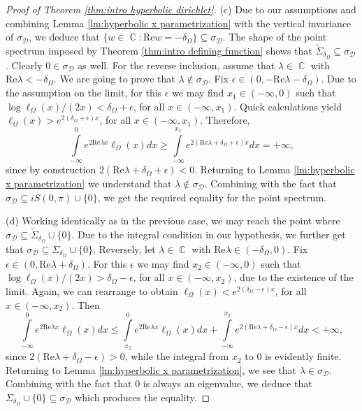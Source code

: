 \documentclass[10pt,a4paper]{amsart}
\DeclareMathOperator{\C}{\mathbb{C}}
\begin{document}
\begin{proof}[Proof of Theorem \ref{thm:intro hyperbolic dirichlet}]
		(c) Due to our assumptions and combining Lemma \ref{lm:hyperbolic x parametrization} with the vertical invariance of $\sigma_\mathcal{D}$, we deduce that $\{w\in\C:\mathrm{Re}w=-\delta_\Omega\}\subseteq\sigma_{\mathcal{D}}$. The shape of the point spectrum imposed by Theorem \ref{thm:intro defining function} shows that $\widetilde{\Sigma}_{\delta_\Omega}\subseteq\sigma_{\mathcal{D}}$. Clearly $0\in\sigma_{\mathcal{D}}$ as well. For the reverse inclusion, assume that $\lambda\in\C$ with $\mathrm{Re}\lambda<-\delta_\Omega$. We are going to prove that $\lambda\notin\sigma_{\mathcal{D}}$. Fix $\epsilon\in(0,-\mathrm{Re}\lambda-\delta_\Omega)$. Due to the assumption on the limit, for this $\epsilon$ we may find $x_1\in(-\infty,0)$ such that $\log\ell_\Omega(x)/(2x)<\delta_\Omega+\epsilon$, for all $x\in(-\infty,x_1)$. Quick calculations yield $\ell_\Omega(x)>e^{2(\delta_\Omega+\epsilon)x}$, for all $x\in(-\infty,x_1)$. Therefore,
		\begin{equation*}
			\int\limits_{-\infty}^{0}e^{2\mathrm{Re}\lambda x}\ell_\Omega(x)dx\ge\int\limits_{-\infty}^{x_1}e^{2(\mathrm{Re}\lambda+\delta_\Omega+\epsilon)x}dx=+\infty,
		\end{equation*}
		since by construction $2(\mathrm{Re}\lambda+\delta_\Omega+\epsilon)<0$. Returning to Lemma \ref{lm:hyperbolic x parametrization} we understand that $\lambda\notin\sigma_{\mathcal{D}}$. Combining with the fact that $\sigma_{\mathcal{D}}\subseteq iS(0,\pi)\cup\{0\}$, we get the required equality for the point spectrum.
		
		(d) Working identically as in the previous case, we may reach the point where $\sigma_{\mathcal{D}}\subseteq \widetilde{\Sigma}_{\delta_\Omega}\cup\{0\}$. Due to the integral condition in our hypothesis, we further get that $\sigma_{\mathcal{D}}\subseteq \Sigma_{\delta_\Omega}\cup\{0\}$. Reversely, let $\lambda\in\C$ with $\mathrm{Re}\lambda\in(-\delta_\Omega,0)$. Fix $\epsilon\in(0,\mathrm{Re}\lambda+\delta_\Omega)$. For this $\epsilon$ we may find $x_2\in(-\infty,0)$ such that $\log\ell_\Omega(x)/(2x)>\delta_\Omega-\epsilon$, for all $x\in(-\infty,x_2)$, due to the existence of the limit. Again, we can rearrange to obtain $\ell_\Omega(x)<e^{2(\delta_\Omega-\epsilon)x}$, for all $x\in(-\infty,x_2)$. Then
		\begin{equation*}
			\int\limits_{-\infty}^{0}e^{2\mathrm{Re}\lambda x}\ell_\Omega(x)dx\le\int\limits_{x_2}^{0}e^{2\mathrm{Re}\lambda x}\ell_\Omega(x)dx+\int\limits_{-\infty}^{x_2}e^{2(\mathrm{Re}\lambda+\delta_\Omega-\epsilon)x}dx<+\infty,
		\end{equation*}
		since $2(\mathrm{Re}\lambda+\delta_\Omega-\epsilon)>0$, while the integral from $x_2$ to $0$ is evidently finite. Returning to Lemma \ref{lm:hyperbolic x parametrization}, we see that $\lambda\in\sigma_{\mathcal{D}}$. Combining with the fact that $0$ is always an eigenvalue, we deduce that $\Sigma_{\delta_\Omega}\cup\{0\}\subseteq\sigma_{\mathcal{D}}$ which produces the equality.
		

\end{proof}
\end{document}
